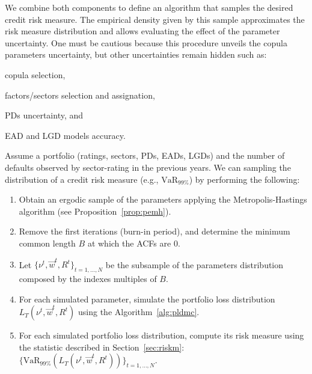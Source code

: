 \documentclass[11pt,fleqn]{book} %
\begin{document}
We combine both components to define an algorithm that samples the desired
credit risk measure. The empirical density given by this sample 
approximates the risk measure distribution and allows evaluating the 
effect of the parameter uncertainty. One must be cautious because this 
procedure unveils the copula parameters uncertainty, but other uncertainties
remain hidden such as:
\begin{inparaenum}[1)]
	\item copula selection, 
	\item factors/sectors selection and assignation,
	\item PDs uncertainty, and
	\item EAD and LGD models accuracy.
\end{inparaenum}

\begin{algorithm}
	\label{alg:crmd}
	Assume a portfolio (ratings, sectors, PDs, EADs, LGDs) and the number 
	of defaults observed by sector-rating in the previous years. We can
	sampling the distribution of a credit risk measure (e.g., 
	$\text{VaR}_{99\%}$) by performing the following:
	\begin{enumerate}
		\item Obtain an ergodic sample of the parameters applying the
		Metropolis-Hastings algorithm (see Proposition~\ref{prop:pemh}).
		\item Remove the first iterations (burn-in period), and determine
		the minimum common length $B$ at which the ACFs are $0$.
		\item Let $\{\nu^t, \vec{w}^t, R^t\}_{t=1,\dots,N}$ be the subsample
		of the parameters distribution composed by the indexes multiples 
		of $B$.
		\item For each simulated parameter, simulate the portfolio loss 
		distribution $L_T(\nu^t,\vec{w}^t,R^t)$ using the Algorithm~\ref{alg:pldmc}.
		\item For each simulated portfolio loss distribution, compute its 
		risk measure using the statistic described in Section~\ref{sec:riskm}:
		$\{\text{VaR}_{99\%}(L_T(\nu^t,\vec{w}^t,R^t))\}_{t=1,\dots,N}$.
	\end{enumerate}
\end{algorithm}
\end{document}
